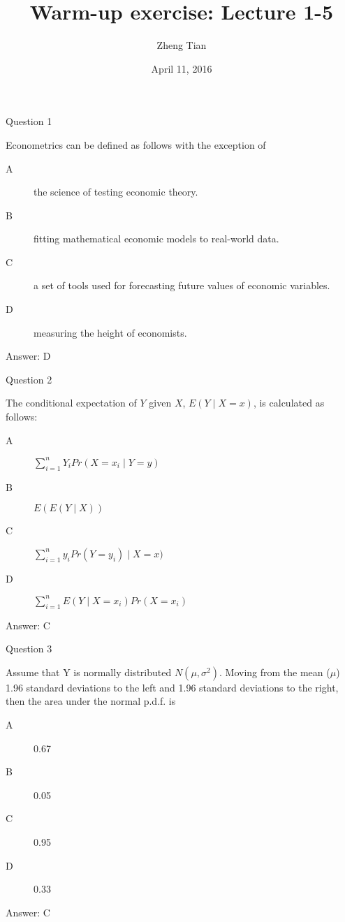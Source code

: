 \documentclass[presentation,10pt]{beamer}
\author{Zheng Tian}
\date{April 11, 2016}
\title{Warm-up exercise: Lecture 1-5}
\begin{document}
\maketitle



\begin{frame}[label={sec:orgba06bc2}]{Question 1}
\begin{block}{Econometrics can be defined as follows with the exception of}
\begin{description}
\item[{A}] the science of testing economic theory.
\item[{B}] fitting mathematical economic models to real-world data.
\item[{C}] a set of tools used for forecasting future values of economic variables.
\item[{D}] measuring the height of economists.
\end{description}
\vspace{1cm}
\pause
\alert{Answer: D}
\end{block}
\end{frame}


\begin{frame}[label={sec:orga72dd07}]{Question 2}
\begin{block}{The conditional expectation of \(Y\) given \(X\), \(E(Y\mid X=x)\), is calculated as follows:}
\begin{description}
\item[{A}] \(\sum_{i=1}^n Y_i Pr(X=x_i \mid Y=y)\)
\item[{B}] \(E(E(Y \mid X))\)
\item[{C}] \(\sum_{i=1}^n y_i Pr(Y=y_i) \mid X=x)\)
\item[{D}] \(\sum_{i=1}^n E(Y \mid X=x_i) Pr(X=x_i)\)
\end{description}
\vspace{1cm}
\pause
\alert{Answer: C}
\end{block}
\end{frame}


\begin{frame}[label={sec:orgd6dc5ea}]{Question 3}
\begin{block}{Assume that Y is normally distributed \(N(\mu, \sigma^2)\). Moving from the mean (\(\mu\)) 1.96 standard deviations to the left and 1.96 standard deviations to the right, then the area under the normal p.d.f. is}
\begin{description}
\item[{A}] 0.67
\item[{B}] 0.05
\item[{C}] 0.95
\item[{D}] 0.33
\end{description}
\vspace{1cm}
\pause
\alert{Answer: C}
\end{block}
\end{frame}
\end{document}
